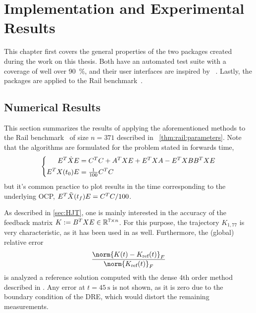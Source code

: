 \chapter{Implementation and Experimental Results}

This chapter first covers the general properties of the two packages created during the work on this thesis.
Both have an automated test suite with a coverage of well over \SI{90}{\percent},
and their user interfaces are inspired by ~\cite{DifferentialEquations}.
Lastly, the packages are applied to
the Rail benchmark~\cite{morwiki_steel}.




\section{Numerical Results}

This section summarizes the results of applying the aforementioned methods to
the Rail benchmark~\cite{morwiki_steel} of size $n=371$
described in \eg~\autoref{thm:rail:parameters}.
Note that the algorithms are formulated for the problem stated in forwards time,
\begin{equation}
\left\{
\begin{aligned}
  E^T \dot X E &= C^T C + A^T X E + E^T X A - E^T X BB^T X E \\
  E^T X(t_0) E &= \tfrac{1}{100} C^T C
\end{aligned}
\right.
\end{equation}
but it's common practice to plot results in the time corresponding to the underlying \ac{OCP},
\ie $E^T \tilde X(t_f) E = C^T C/100$.

As described in \autoref{sec:HJT},
one is mainly interested in the accuracy of the feedback matrix
$
  K := B^T X E \in \mathbb{R}^{7 \times n}
$.
For this purpose, the trajectory $K_{1,77}$ is very characteristic,
as it has been used in \cite[Fig.~1]{Lang2015} as well.
Furthermore, the (global) relative error
\begin{equation}
\label{eq:results:err:ref}
  \frac{\norm{K(t) - K_\text{ref}(t)}_F}{\norm{K_\text{ref}(t)}_F}
\end{equation}
is analyzed \wrt a reference solution computed with the dense 4th order method described in \cite[Appendix~A]{Lang2017}.
Any error at $t=\SI{45}{\second}$ is not shown,
as it is zero due to the boundary condition of the \ac{DRE},
which would distort the remaining measurements.


